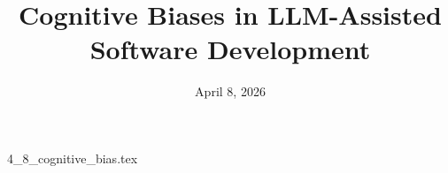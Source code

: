 \documentclass{article}      %
\title{Cognitive Biases in LLM-Assisted Software Development}  %
\date{April 8, 2026}
\begin{document}

\maketitle                   %



{4_8_cognitive_bias.tex}
\printbibliography
\end{document}
